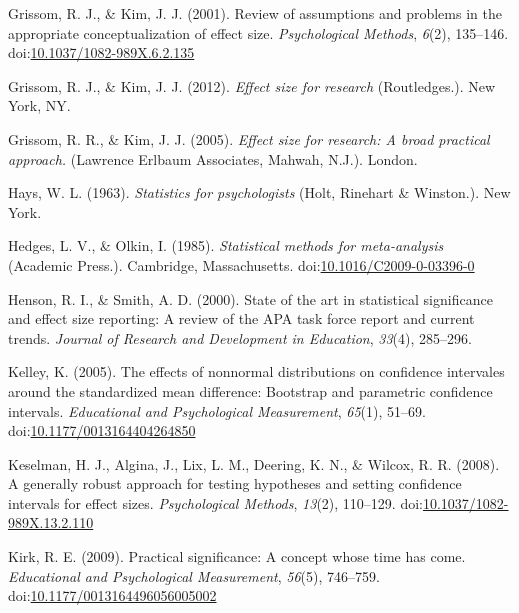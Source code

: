 \documentclass[
  man,floatsintext]{apa6}
\begin{document}
\leavevmode\hypertarget{ref-Grissom_Kim_2001}{}%
Grissom, R. J., \& Kim, J. J. (2001). Review of assumptions and problems in the appropriate conceptualization of effect size. \emph{Psychological Methods}, \emph{6}(2), 135--146. doi:\href{https://doi.org/10.1037/1082-989X.6.2.135}{10.1037/1082-989X.6.2.135}

\leavevmode\hypertarget{ref-Grissom_and_Kim_2012}{}%
Grissom, R. J., \& Kim, J. J. (2012). \emph{Effect size for research} (Routledges.). New York, NY.

\leavevmode\hypertarget{ref-Grissom_and_kim_2005}{}%
Grissom, R. R., \& Kim, J. J. (2005). \emph{Effect size for research: A broad practical approach.} (Lawrence Erlbaum Associates, Mahwah, N.J.). London.

\leavevmode\hypertarget{ref-Hays_1963}{}%
Hays, W. L. (1963). \emph{Statistics for psychologists} (Holt, Rinehart \& Winston.). New York.

\leavevmode\hypertarget{ref-Hedges_Olkin_1985}{}%
Hedges, L. V., \& Olkin, I. (1985). \emph{Statistical methods for meta-analysis} (Academic Press.). Cambridge, Massachusetts. doi:\href{https://doi.org/10.1016/C2009-0-03396-0}{10.1016/C2009-0-03396-0}

\leavevmode\hypertarget{ref-Henson_Smith_2000}{}%
Henson, R. I., \& Smith, A. D. (2000). State of the art in statistical significance and effect size reporting: A review of the APA task force report and current trends. \emph{Journal of Research and Development in Education}, \emph{33}(4), 285--296.

\leavevmode\hypertarget{ref-Kelley_2005}{}%
Kelley, K. (2005). The effects of nonnormal distributions on confidence intervales around the standardized mean difference: Bootstrap and parametric confidence intervals. \emph{Educational and Psychological Measurement}, \emph{65}(1), 51--69. doi:\href{https://doi.org/10.1177/0013164404264850}{10.1177/0013164404264850}

\leavevmode\hypertarget{ref-Keselman_et_al_2008}{}%
Keselman, H. J., Algina, J., Lix, L. M., Deering, K. N., \& Wilcox, R. R. (2008). A generally robust approach for testing hypotheses and setting confidence intervals for effect sizes. \emph{Psychological Methods}, \emph{13}(2), 110--129. doi:\href{https://doi.org/10.1037/1082-989X.13.2.110}{10.1037/1082-989X.13.2.110}

\leavevmode\hypertarget{ref-Kirk_2009}{}%
Kirk, R. E. (2009). Practical significance: A concept whose time has come. \emph{Educational and Psychological Measurement}, \emph{56}(5), 746--759. doi:\href{https://doi.org/10.1177/0013164496056005002\%20}{10.1177/0013164496056005002 }
\end{document}
